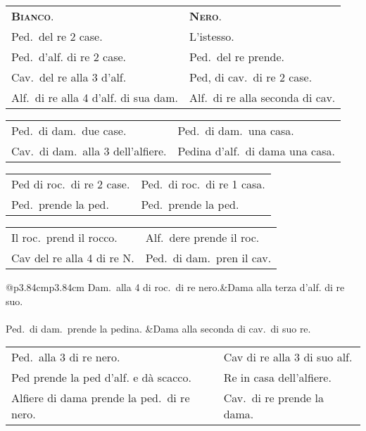 \documentclass[11pt,a6paper]{article}
\newcommand{\markerC}{{\small$\downarrow$}}
\begin{document}
{\small
\noindent
\begin{tabular}{@{}p{3.84cm}p{3.84cm}}
 {\bfseries\scshape Bianco}. & {\bfseries\scshape Nero}.\\
Ped.\ del re 2 case.&L'istesso.\\
Ped.\ d'alf. di re 2 case.&Ped.\ del re prende.\\
Cav.\ del re alla 3 d'alf.&Ped, di cav.\ di re 2 case.\\
Alf.\ di re alla 4 d'alf. di sua dam. &Alf.\ di re alla seconda di cav. \\
\end{tabular}

\noindent\begin{tabular}{@{}p{3.84cm}p{3.84cm}}
Ped.\ di dam.\ due case.&Ped.\ di dam.\ una casa.\\
Cav.\ di dam.\ alla 3 dell'alfiere.&Pedina d'alf.\ di dama una casa. \\
\end{tabular}

\noindent\begin{tabular}{@{}p{3.84cm}p{3.84cm}}
Ped di roc.\ di re 2 case.&Ped.\ di roc.\ di re 1 casa.\\
Ped.\ prende la ped.&Ped.\ prende la ped.\\
\end{tabular}

\noindent\begin{tabular}{@{}p{3.84cm}p{3.84cm}}
Il roc.\ prend il rocco.&Alf.\ dere prende il roc.\\
Cav del re alla 4 di re N.&Ped.\ di dam.\ pren il cav.\\
\end{tabular}

\noindent\begin{tabular}{@{}p{3.84cm}p{3.84cm}}
Dam.\ alla 4 di roc.\ di re nero.&Dama alla terza d'alf. di re suo.\\
\multicolumn{2}{@{}c}{\markerC} \\
Ped.\ di dam.\ prende la pedina. &Dama alla seconda di cav.\ di suo re.\ \\
\end{tabular}

\noindent\begin{tabular}{@{}p{3.84cm}p{3.84cm}}
Ped.\ alla 3 di re nero.&Cav di re alla 3 di suo alf.\\
Ped prende la ped d'alf. e dà scacco.&Re in casa dell'alfiere.\\
Alfiere di dama prende la ped.\ di re nero.&Cav.\ di re prende la dama.\\
\end{tabular}
}
\end{document}
